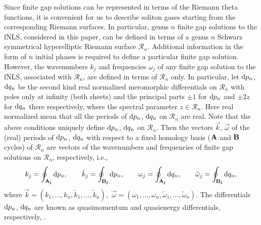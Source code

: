 \documentclass[pdftex]{sigma}
\numberwithin{equation}{section}
\renewcommand{\o}{\omega}
\def\Rscr{\mathcal{R}}
\def\o{\omega}
\def\tk{\tilde k}
\def\to{\tilde \o}
\begin{document}
Since finite gap solutions can be represented in terms of the Riemann theta functions, it is convenient for us to describe soliton gases starting from the corresponding Riemann surfaces. In particular, genus $n$
finite gap solutions to the fNLS, considered in this paper, can be defined in terms of a genus $n$ Schwarz symmetrical hyperelliptic Riemann surface $\Rscr_n$. Additional information in the form of $n$ initial phases is required to define a particular finite gap solution. However, the
wavenumbers $k_j$ and frequencies $\o_j$ of any finite gap solution to the fNLS, associated with $\Rscr_n$, are defined in terms of $\Rscr_n$ only. In particular, let ${\rm d}p_n$, ${\rm d}q_n$ be the second kind real normalized meromorphic differentials on $\Rscr_n$ with poles only at infinity (both sheets) and the principal parts $\pm 1$ for ${\rm d}p_n$ and $\pm 2z$ for ${\rm d}q_n$ there respectively, where the spectral parameter $z\in \Rscr_n$. Here real normalized mean that all the periods of ${\rm d}p_n$, ${\rm d}q_n$ on $\Rscr_n$ are real.
Note that the above conditions uniquely define ${\rm d}p_n$, ${\rm d}q_n$ on $\Rscr_n$.
Then the vectors $\vec k$, $\vec \o$ of the (real) periods of ${\rm d}p_n$, ${\rm d}q_n$ with respect to a fixed homology basis ($\bf A$ and $\bf B$ cycles) of $\Rscr_n$ are vectors of the wavenumbers and frequencies of finite gap solutions on $\Rscr_n$, respectively, i.e.,
\begin{equation*}%
k_j=\oint_{\bf A_j}{\rm d}p_n,\qquad \tk_j= \oint_{\bf B_j}{\rm d}p_n,\qquad
\o_j=\oint_{\bf A_j}{\rm d}q_n,\qquad \to _j= \oint_{\bf B_j}{\rm d}q_n,
\end{equation*}
%
where $\vec k=(k_1,\dots,k_n,\tk_1,\dots,\tk_n),$ $\vec \o=(\o_1,\dots,\o_n,\to_1,\dots,\to_n)$.
The differentials ${\rm d}p_n$, ${\rm d}q_n$ are known as quasimomentum and quasienergy differentials, respectively, \cite{FFM,ForLee}.
\end{document}
